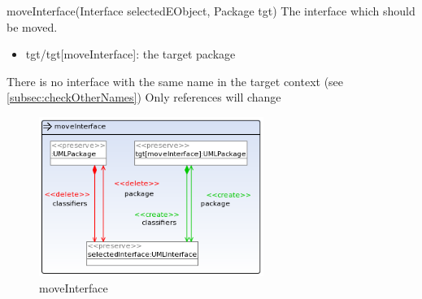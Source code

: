 {moveInterface(Interface selectedEObject, Package tgt)}
{The interface which should be moved.}
{
\begin{itemize}
 \item tgt/tgt[moveInterface]: the target package
\end{itemize}
}
{There is no interface with the same name in the target context (see
\ref{subsec:checkOtherNames})}
{Only references will change}
\begin{figure}[H]
  \centering
  \includegraphics[width=0.65\textwidth]{pics/moveInterface.png}
  \caption{moveInterface}
  \label{moveInterface}
\end{figure}